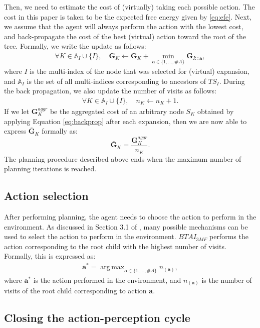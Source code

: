 \documentclass[twoside,11pt]{article}
\DeclareMathOperator*{\argmax}{arg\,max}
\newcommand{\nb}[1]{\# #1}
\begin{document}
Then, we need to estimate the cost of (virtually) taking each possible action. The cost in this paper is taken to be the expected free energy given by \eqref{eq:efe}. Next, we assume that the agent will always perform the action with the lowest cost, and back-propagate the cost of the best (virtual) action toward the root of the tree. Formally, we write the update as follows:
\begin{align}\label{eq:backprop}
\forall K \in \mathbb{A}_I \cup \{I\}, \quad \bm{G}_K \leftarrow \bm{G}_K + \min_{\bm{a} \in \{1, ..., \nb{A}\}} \bm{G}_{I::\bm{a}},
\end{align}
where $I$ is the multi-index of the node that was selected for (virtual) expansion, and $\mathbb{A}_I$ is the set of all multi-indices corresponding to ancestors of $TS_I$. During the back propagation, we also update the number of visits as follows:
\begin{align}\label{eq:backprop_n}
\forall K \in \mathbb{A}_I \cup \{I\}, \quad n_K \leftarrow n_K + 1.
\end{align}
If we let $\bm{G}^{aggr}_K$ be the aggregated cost of an arbitrary node $S_K$ obtained by applying Equation \ref{eq:backprop} after each expansion, then we are now able to express $\bar{\bm{G}}_K$ formally as:
$$\bar{\bm{G}}_K = \frac{\bm{G}^{aggr}_K}{n_K}.$$
The planning procedure described above ends when the maximum number of planning iterations is reached.

\subsection{Action selection} \label{ssec:action_selection}

After performing planning, the agent needs to choose the action to perform in the environment. As discussed in Section 3.1 of \citep{MCTS}, many possible mechanisms can be used to select the action to perform in the environment. $BTAI_{3MF}$ performs the action corresponding to the root child with the highest number of visits. Formally, this is expressed as:
\begin{align}\label{eq:action_selection}
\bm{a}^* = \argmax_{\bm{a} \in \{1, ..., \nb{A}\}} n_{(\bm{a})},
\end{align}
where $\bm{a}^*$ is the action performed in the environment, and $n_{(\bm{a})}$ is the number of visits of the root child corresponding to action $\bm{a}$.

\subsection{Closing the action-perception cycle}
\end{document}
